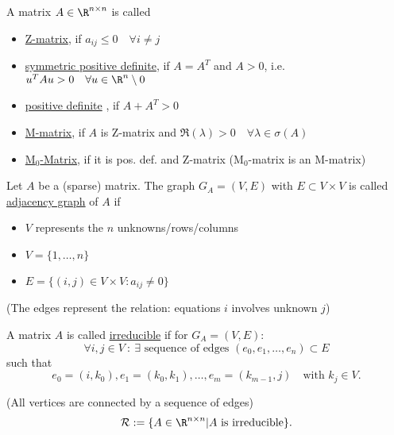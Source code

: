 \begin{definition}
\label{thm:typeOfMatrices}
	A matrix $A \in  \R^{n \times n}$ is called
	\begin{itemize}
		\item \underline{Z-matrix}, if $a_{ij}\leq 0\quad \forall i\neq j$
		\item \underline{symmetric positive definite}, if $A=A^{T}$ and $A>0$, i.e. $u^{T}Au>0\quad\forall u \in \R^{n} \setminus 0$
		\item \underline{positive definite} , if $A+A^{T}>0$
		\item \underline{M-matrix}, if $A$ is Z-matrix and $\Re(\lambda) > 0 \quad\forall \lambda \in \sigma (A)$
		\item \underline{M$_{0}$-Matrix}, if it is pos. def. and Z-matrix (M$_{0}$-matrix is an M-matrix)
	\end{itemize}
\end{definition}

\begin{definition}
\label{thm:adjacenyGraph}
Let $A$ be a (sparse) matrix. The graph $G_{A}=(V,E)$ with $E \subset V \times V$ is called \underline{adjacency graph} of $A$ if 
\begin{itemize}[label=]
	\item $V$ represents the $n$ unknowns/rows/columns
	\item $V=\{1, \ldots, n\}$
	\item $E=\{(i,j) \in  V \times V : a_{ij}\neq 0\}$
\end{itemize}
(The edges represent the relation: equations $i$ involves unknown $j$)
\end{definition}

\begin{definition}
\label{thm:}
A matrix $A$ is called \underline{irreducible} if for $G_{A}=(V,E)$:
\[
	\forall i,j \in V ~:~ \exists \text{ sequence of edges } (e_0, e_1, \ldots , e_{n}) \subset E
\] 
such that
\[
	e_0=(i, k_0), e_1=(k_0,k_1),\ldots , e_{m}=(k_{m-1},j) \quad \text{with } k_{j} \in V
.\] 

(All vertices are connected by a sequence of edges)
\[
	\mathcal{R}:= \{A \in  \R^{n \times  n} | A \text{ is irreducible}\}
.\] 

\end{definition}
